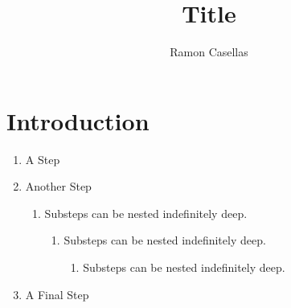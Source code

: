 \documentclass[pdftex,english,a4paper,10pt]{article}
\title{Title}
\author{Ramon Casellas}
\begin{document}
\maketitle

\section{Introduction}
\label{id2783443}\hypertarget{id2783443}{}%
{}
\begin{enumerate}
\item{{ A Step }}
\item{{ Another Step \begin{enumerate}
\item{{ Substeps can be nested indefinitely deep.  \begin{enumerate}
\item{{ Substeps can be nested indefinitely deep.  \begin{enumerate}
\item{{ Substeps can be nested indefinitely deep.  }}
\end{enumerate}
}}
\end{enumerate}
}}
\end{enumerate}
}}
\item{{
    A Final Step
  }}
\end{enumerate}

\end{document}
